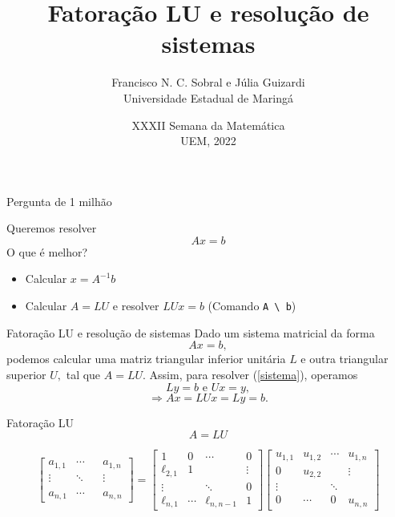 \documentclass[]{beamer}
\author[Sobral, Guizardi]{Francisco N. C. Sobral e Júlia Guizardi\\ Universidade Estadual de Maringá}
\date[XXIX SEMAT]{XXXII Semana da Matemática\\UEM, 2022}
\title[Mat. Mult.]{Fatoração LU e resolução de sistemas}
\newcommand{\code}[1]{\colorbox[gray]{0.8}{\texttt{#1}}}
\begin{document}
	
	\begin{frame}[plain]
	\titlepage
\end{frame}

\begin{frame}{Pergunta de 1 milhão}

Queremos resolver
\[
Ax = b
\]
O que é melhor?
\begin{itemize}
	\item Calcular $x = A^{-1} b$
	\item Calcular $A = LU$ e resolver $LUx = b$ (Comando \code{A \textbackslash\ b})
\end{itemize}

\end{frame}

\begin{frame}{Fatoração LU e resolução de sistemas}
Dado um sistema matricial da forma 
\begin{equation}\label{sistema}
Ax=b,
\end{equation}
podemos calcular uma matriz triangular inferior unitária $L$ e outra triangular superior $U,$ tal que $A=LU.$ Assim, para resolver (\ref{sistema}), operamos
$$Ly=b \text{  e  } Ux=y,$$
$$\Rightarrow Ax=LUx=Ly=b.$$
\end{frame}

\begin{frame}{Fatoração LU}
\begin{equation}
A=LU
\end{equation}

$$
\begin{bmatrix}
a_{1,1} & \cdots &  & a_{1,n}\\
\vdots & \ddots  & & \vdots\\
& &  & \\
a_{n,1} & \cdots &  & a_{n,n}
\end{bmatrix}
=
\begin{bmatrix}
1 & 0 & \cdots & 0\\
\ell_{2,1} & 1 & & \vdots\\
\vdots & & \ddots & 0\\
\ell_{n,1} & \cdots & \ell_{n,n-1} & 1
\end{bmatrix}\begin{bmatrix}
u_{1,1} & u_{1,2} & \cdots & u_{1,n}\\
0 & u_{2,2} & & \vdots\\
\vdots & & \ddots & \\
0 & \cdots & 0 & u_{n,n}
\end{bmatrix}
$$
\end{frame}
\end{document}
